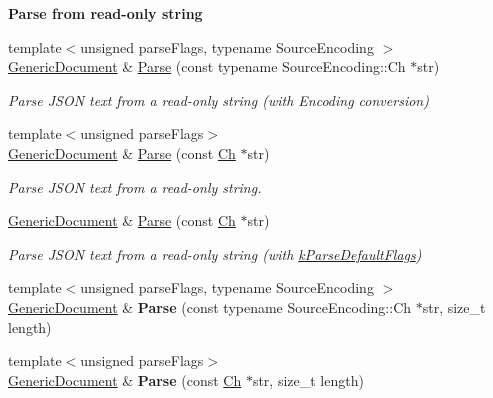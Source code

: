 \begin{Indent}{\bf Parse from read-\/only string}\par
\begin{DoxyCompactItemize}
\item 
{\footnotesize template$<$unsigned parse\+Flags, typename Source\+Encoding $>$ }\\\hyperlink{classGenericDocument}{Generic\+Document} \& \hyperlink{classGenericDocument_aadee36db7064cc9894a75c848831cdae}{Parse} (const typename Source\+Encoding\+::\+Ch $\ast$str)
\begin{DoxyCompactList}\small\item\em Parse J\+S\+ON text from a read-\/only string (with Encoding conversion) \end{DoxyCompactList}\item 
{\footnotesize template$<$unsigned parse\+Flags$>$ }\\\hyperlink{classGenericDocument}{Generic\+Document} \& \hyperlink{classGenericDocument_a5e377f840009b5cee6757be29525ce0b}{Parse} (const \hyperlink{classGenericValue_ade0e0ce64ccd5d852da57a35e720bafb}{Ch} $\ast$str)
\begin{DoxyCompactList}\small\item\em Parse J\+S\+ON text from a read-\/only string. \end{DoxyCompactList}\item 
\hyperlink{classGenericDocument}{Generic\+Document} \& \hyperlink{classGenericDocument_a49ae6de6fd0bc820d9864a106c10b4da}{Parse} (const \hyperlink{classGenericValue_ade0e0ce64ccd5d852da57a35e720bafb}{Ch} $\ast$str)
\begin{DoxyCompactList}\small\item\em Parse J\+S\+ON text from a read-\/only string (with \hyperlink{reader_8h_ab7be7dabe6ffcba60fad441505583450a9104b0946d648e9467cb7a967401ec80}{k\+Parse\+Default\+Flags}) \end{DoxyCompactList}\item 
{\footnotesize template$<$unsigned parse\+Flags, typename Source\+Encoding $>$ }\\\hyperlink{classGenericDocument}{Generic\+Document} \& {\bfseries Parse} (const typename Source\+Encoding\+::\+Ch $\ast$str, size\+\_\+t length)\hypertarget{classGenericDocument_a46b5028cc760c4e915a0d5216af9f7e2}{}\label{classGenericDocument_a46b5028cc760c4e915a0d5216af9f7e2}

\item 
{\footnotesize template$<$unsigned parse\+Flags$>$ }\\\hyperlink{classGenericDocument}{Generic\+Document} \& {\bfseries Parse} (const \hyperlink{classGenericValue_ade0e0ce64ccd5d852da57a35e720bafb}{Ch} $\ast$str, size\+\_\+t length)\hypertarget{classGenericDocument_a93fec16eacec4f4b42075bb3bc242a6b}{}\label{classGenericDocument_a93fec16eacec4f4b42075bb3bc242a6b}


\end{DoxyCompactItemize}
\end{Indent}
